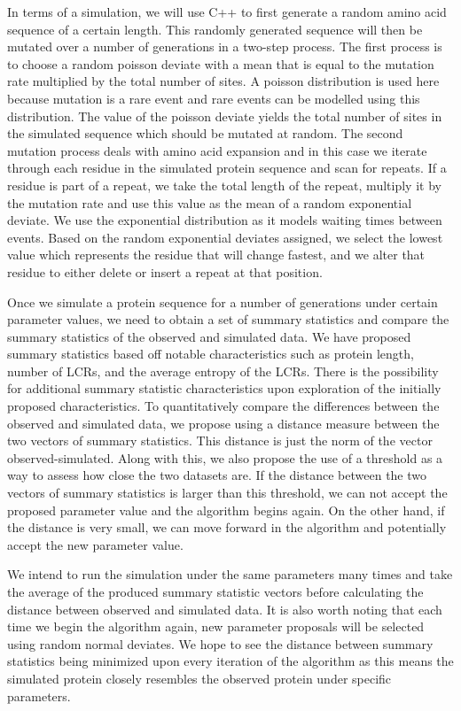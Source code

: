 \documentclass[10pt]{article}
\begin{document}
In terms of a simulation, we will use C++ to first generate a random amino acid sequence of a certain length. This
randomly generated sequence will then be mutated over a number of generations in a two-step process. The first process is
to choose a random poisson deviate with a mean that is equal to the mutation rate multiplied by the total number of sites. A
poisson distribution is used here because mutation is a rare event and rare events can be modelled using this distribution. The
value of the poisson deviate yields the total number of sites in the simulated sequence which should be mutated at random.
The second mutation process deals with amino acid expansion and in this case we iterate through each residue in the simulated
protein sequence and scan for repeats. If a residue is part of a repeat, we take the total length of the repeat, multiply it by the
mutation rate and use this value as the mean of a random exponential deviate. We use the exponential distribution as it models
waiting times between events. Based on the random exponential deviates assigned, we select the lowest value which represents
the residue that will change fastest, and we alter that residue to either delete or insert a repeat at that position.

Once we simulate a protein sequence for a number of generations under certain parameter values, we need to obtain a
set of summary statistics and compare the summary statistics of the observed and simulated data. We have proposed summary
statistics based off notable characteristics such as protein length, number of LCRs, and the average entropy of the LCRs. There
is the possibility for additional summary statistic characteristics upon exploration of the initially proposed characteristics. To
quantitatively compare the differences between the observed and simulated data, we propose using a distance measure between
the two vectors of summary statistics. This distance is just the norm of the vector observed-simulated. Along with this, we also
propose the use of a threshold as a way to assess how close the two datasets are. If the distance between the two vectors of
summary statistics is larger than this threshold, we can not accept the proposed parameter value and the algorithm begins again.
On the other hand, if the distance is very small, we can move forward in the algorithm and potentially accept the new parameter
value.

We intend to run the simulation under the same parameters many times and take the average of the produced summary
statistic vectors before calculating the distance between observed and simulated data. It is also worth noting that each time we
begin the algorithm again, new parameter proposals will be selected using random normal deviates. We hope to see the distance
between summary statistics being minimized upon every iteration of the algorithm as this means the simulated protein closely
resembles the observed protein under specific parameters.
\end{document}
